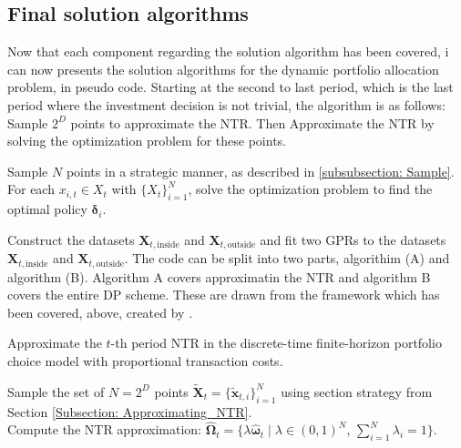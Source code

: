 \documentclass[11pt]{article}
\begin{document}
\subsection{Final solution algorithms} \label{Subsection: Algorithm}
Now that each component regarding the solution algorithm has been covered, i can now presents the solution algorithms for the dynamic portfolio allocation problem, in pseudo code.
Starting at the second to last period, which is the last period where the investment decision is not trivial, the algorithm is as follows:
Sample $2^{D}$ points to approximate the \ac{NTR}. Then Approximate the \ac{NTR} by solving the optimization problem for these points.

Sample $N$ points in a strategic manner, as described in \ref{subsubsection: Sample}. For each $x_{i,t} \in X_{t}$ with $\{ X_t \}^{N}_{i=1}$, solve the optimization problem to find the optimal policy $\boldsymbol{\delta}_{i}$.

Construct the datasets $\mathbf{X}_{t,\text{inside}}$ and $\mathbf{X}_{t,\text{outside}}$ and fit two \ac{GPR}s to the datasets $\mathbf{X}_{t,\text{inside}}$ and $\mathbf{X}_{t,\text{outside}}$.
The code can be split into two parts, algorithim (A) and algorithm (B). Algorithm A covers approximatin the NTR and algorithm B covers the entire \ac{DP} scheme.
These are drawn from the framework which has been covered, above, created by \autocite{Scheidegger2023}.

\begin{tcolorbox}[algobox]
\scriptsize{
\begin{algorithm}[H]
  \caption{Approximate the $t$-th period NTR in the discrete-time finite-horizon portfolio choice model with proportional transaction costs.}
  Sample the set of $N = 2^D$ points $\tilde{\mathbf{X}}_t = \{\tilde{\mathbf{x}}_{t,i}\}_{i=1}^N$ using section strategy from Section \ref{Subsection: Approximating_NTR}.\\
  Compute the NTR approximation: $\hat{\boldsymbol{\Omega}}_t = \{\lambda \hat{\boldsymbol{\omega}}_t \mid \lambda \in (0,1)^N, \, \sum_{i=1}^N \lambda_i = 1\}$.
\end{algorithm}
}
\end{tcolorbox}
\end{document}
